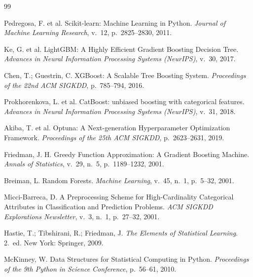 \documentclass[12pt, a4paper]{article}
\begin{document}
\newpage
\begin{thebibliography}{99}

Pedregosa, F. et al. Scikit-learn: Machine Learning in Python. \textit{Journal of Machine Learning Research}, v.~12, p.~2825--2830, 2011.

Ke, G. et al. LightGBM: A Highly Efficient Gradient Boosting Decision Tree. \textit{Advances in Neural Information Processing Systems (NeurIPS)}, v.~30, 2017.

Chen, T.; Guestrin, C. XGBoost: A Scalable Tree Boosting System. \textit{Proceedings of the 22nd ACM SIGKDD}, p.~785--794, 2016.

Prokhorenkova, L. et al. CatBoost: unbiased boosting with categorical features. \textit{Advances in Neural Information Processing Systems (NeurIPS)}, v.~31, 2018.

Akiba, T. et al. Optuna: A Next-generation Hyperparameter Optimization Framework. \textit{Proceedings of the 25th ACM SIGKDD}, p.~2623--2631, 2019.

Friedman, J. H. Greedy Function Approximation: A Gradient Boosting Machine. \textit{Annals of Statistics}, v.~29, n.~5, p.~1189--1232, 2001.

Breiman, L. Random Forests. \textit{Machine Learning}, v.~45, n.~1, p.~5--32, 2001.

Micci-Barreca, D. A Preprocessing Scheme for High-Cardinality Categorical Attributes in Classification and Prediction Problems. \textit{ACM SIGKDD Explorations Newsletter}, v.~3, n.~1, p.~27--32, 2001.

Hastie, T.; Tibshirani, R.; Friedman, J. \textit{The Elements of Statistical Learning}. 2.~ed. New York: Springer, 2009.

McKinney, W. Data Structures for Statistical Computing in Python. \textit{Proceedings of the 9th Python in Science Conference}, p.~56--61, 2010.

\end{thebibliography}
\end{document}
